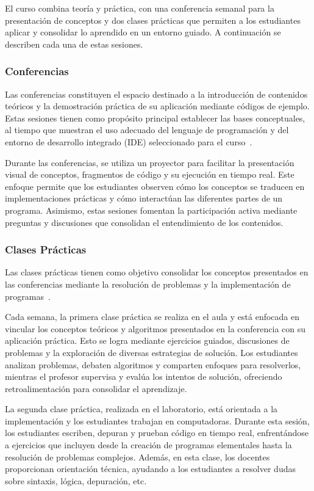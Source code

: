 El curso combina teoría y práctica, con una conferencia semanal para la presentación de conceptos y dos clases prácticas que permiten a los estudiantes aplicar y consolidar lo aprendido en un entorno guiado. A continuación se describen cada una de estas sesiones.

\subsubsection{Conferencias}

Las conferencias constituyen el espacio destinado a la introducción de contenidos teóricos y la demostración práctica de su aplicación mediante códigos de ejemplo. Estas sesiones tienen como propósito principal establecer las bases conceptuales, al tiempo que muestran el uso adecuado del lenguaje de programación y del entorno de desarrollo integrado (IDE) seleccionado para el curso~\cite{plan_estudio_e_2017}.

Durante las conferencias, se utiliza un proyector para facilitar la presentación visual de conceptos, fragmentos de código y su ejecución en tiempo real. Este enfoque permite que los estudiantes observen cómo los conceptos se traducen en implementaciones prácticas y cómo interactúan las diferentes partes de un programa. Asimismo, estas sesiones fomentan la participación activa mediante preguntas y discusiones que consolidan el entendimiento de los contenidos.

\subsubsection{Clases Prácticas}

Las clases prácticas tienen como objetivo consolidar los conceptos presentados en las conferencias mediante la resolución de problemas y la implementación de programas~\cite{plan_estudio_e_2017}.

Cada semana, la primera clase práctica se realiza en el aula y está enfocada en vincular los conceptos teóricos y algoritmos presentados en la conferencia con su aplicación práctica. Esto se logra mediante ejercicios guiados, discusiones de problemas y la exploración de diversas estrategias de solución. Los estudiantes analizan problemas, debaten algoritmos y comparten enfoques para resolverlos, mientras el profesor supervisa y evalúa los intentos de solución, ofreciendo retroalimentación para consolidar el aprendizaje.

La segunda clase práctica, realizada en el laboratorio, está orientada a la implementación y los estudiantes trabajan en computadoras. Durante esta sesión, los estudiantes escriben, depuran y prueban código en tiempo real, enfrentándose a ejercicios que incluyen desde la creación de programas elementales hasta la resolución de problemas complejos. Además, en esta clase, los docentes proporcionan orientación técnica, ayudando a los estudiantes a resolver dudas sobre sintaxis, lógica, depuración, etc. 

